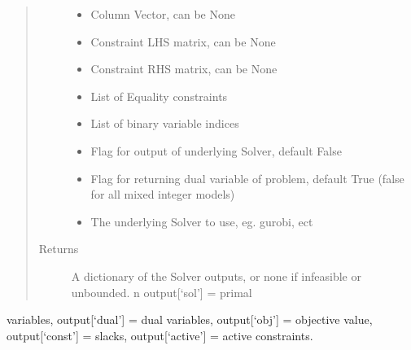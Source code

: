 \documentclass[letterpaper,10pt,english]{sphinxmanual}
\begin{document}
\begin{fulllineitems}
\begin{quote}
\begin{description}
\begin{itemize}
\item {} 
\sphinxAtStartPar
{} \textendash{} Column Vector, can be None

\item {} 
\sphinxAtStartPar
{} \textendash{} Constraint LHS matrix, can be None

\item {} 
\sphinxAtStartPar
{} \textendash{} Constraint RHS matrix, can be None

\item {} 
\sphinxAtStartPar
{} \textendash{} List of Equality constraints

\item {} 
\sphinxAtStartPar
{} \textendash{} List of binary variable indices

\item {} 
\sphinxAtStartPar
{} \textendash{} Flag for output of underlying Solver, default False

\item {} 
\sphinxAtStartPar
{} \textendash{} Flag for returning dual variable of problem, default True (false for all mixed integer models)

\item {} 
\sphinxAtStartPar
{} \textendash{} The underlying Solver to use, eg. gurobi, ect

\end{itemize}

\item[{Returns}] \leavevmode
\sphinxAtStartPar
A dictionary of the Solver outputs, or none if infeasible or unbounded. n output{[}‘sol’{]} = primal

\end{description}\end{quote}

\sphinxAtStartPar
variables, output{[}‘dual’{]} = dual variables, output{[}‘obj’{]} = objective value, output{[}‘const’{]} = slacks,
output{[}‘active’{]} = active constraints.

\end{fulllineitems}

\end{document}
